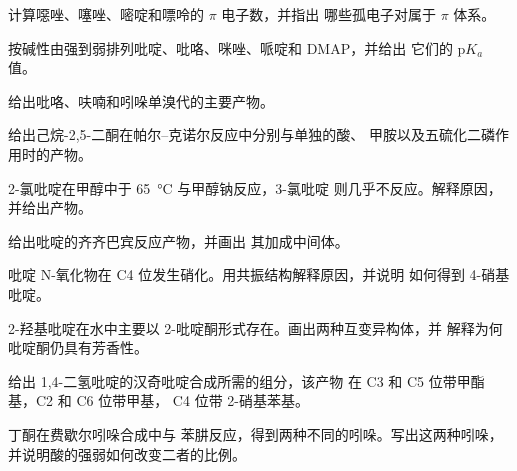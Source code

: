 \begin{exercise}[$\star$]\label{exo:b3:heterocycles:1}
计算噁唑、噻唑、嘧啶和嘌呤的 $\pi$ 电子数，并指出
哪些孤电子对属于 $\pi$ 体系。
\end{exercise}

\begin{exercise}[$\star$]\label{exo:b3:heterocycles:2}
按碱性由强到弱排列吡啶、吡咯、咪唑、哌啶和 DMAP，并给出
它们的 $\mathrm pK_a$ 值。
\end{exercise}

\begin{exercise}[$\star$]\label{exo:b3:heterocycles:3}
给出吡咯、呋喃和吲哚单溴代的主要产物。
\end{exercise}

\begin{exercise}[$\star$]\label{exo:b3:heterocycles:4}
给出己烷-2,5-二酮在帕尔–克诺尔反应中分别与单独的酸、
甲胺以及五硫化二磷作用时的产物。
\end{exercise}

\begin{exercise}[$\star\star$]\label{exo:b3:heterocycles:5}
2-氯吡啶在甲醇中于 \qty{65}{\celsius} 与甲醇钠反应，3-氯吡啶
则几乎不反应。解释原因，并给出产物。
\end{exercise}

\begin{exercise}[$\star\star$]\label{exo:b3:heterocycles:6}
给出吡啶的齐齐巴宾反应产物，并画出
其加成中间体。
\end{exercise}

\begin{exercise}[$\star\star$]\label{exo:b3:heterocycles:7}
吡啶 N-氧化物在 C4 位发生硝化。用共振结构解释原因，并说明
如何得到 4-硝基吡啶。
\end{exercise}

\begin{exercise}[$\star\star$]\label{exo:b3:heterocycles:8}
2-羟基吡啶在水中主要以 2-吡啶酮形式存在。画出两种互变异构体，并
解释为何吡啶酮仍具有芳香性。
\end{exercise}

\begin{exercise}[$\star\star$]\label{exo:b3:heterocycles:9}
给出 1,4-二氢吡啶的汉奇吡啶合成所需的组分，该产物
在 C3 和 C5 位带甲酯基，C2 和 C6 位带甲基，
C4 位带 2-硝基苯基。
\end{exercise}

\begin{exercise}[$\star\star\star$]\label{exo:b3:heterocycles:10}
丁酮在费歇尔吲哚合成中与
苯肼反应，得到两种不同的吲哚。写出这两种吲哚，并说明酸的强弱如何改变二者的比例。
\end{exercise}

